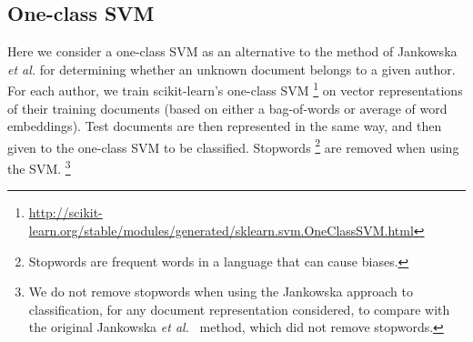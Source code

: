 \documentclass[11pt]{article}
\begin{document}
\subsection{One-class SVM}

Here we consider a one-class SVM as an alternative to the method of
Jankowska \textit{et al.} \cite{jankowska2014} for determining whether
an unknown document belongs to a given author.  For each author, we train scikit-learn's one-class SVM \footnote{\url{http://scikit-learn.org/stable/modules/generated/sklearn.svm.OneClassSVM.html}}
 on vector representations of their training
documents (based on either a bag-of-words or average of
word embeddings). Test documents are then represented in the same
way, and then given to the one-class SVM to be classified. Stopwords \footnote{Stopwords are frequent words in a language that can cause biases.}
are removed when using the SVM. \footnote{We do not
  remove stopwords when using the Jankowska approach to
  classification, for any document representation considered, to
  compare with the original Jankowska \textit{et
    al.}~\cite{jankowska2014} method, which did not remove stopwords.}




\end{document}

